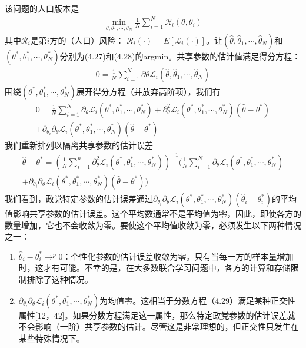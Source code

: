 该问题的人口版本是
\begin{align}
	\min_{\theta, \theta_{1}, \cdots, \theta_{N}} \frac{1}{N} \sum_{i=1}^{N} \mathcal{R}_{i}(\theta, \theta_{i}) \label{eq:4-28}
\end{align}
其中$\mathcal{R}_{i}$是第$i$方的（人口）风险： $\mathcal{R}_{i}(\cdot) = E[\mathcal{L}_{i}(\cdot)]$。让$(\hat{\theta}, \hat{\theta}_{1}, \cdots, \hat{\theta}_{N})$和$(\theta^{*}, \theta_{1}^{*}, \cdots, \theta_{N}^{*})$分别为(4.27)和(4.28)的argmin。共享参数的估计值满足得分方程：
\begin{align}
	0 = \frac{1}{N} \sum_{i=1}^{N} \partial{\theta} \mathcal{L}_{i}(\hat{\theta}, \hat{\theta}_{1}, \cdots, \hat{\theta}_{N})
\end{align}
围绕$(\theta^{*}, \theta_{1}^{*}, \cdots, \theta_{N}^{*})$展开得分方程（并放弃高阶项），我们有
\begin{align*}
	0 = \frac{1}{N} \sum_{i=1}^{N} \partial_{\theta} \mathcal{L}_{i}(\theta^{*}, \theta_{1}^{*}, \cdots, \theta_{N}^{*}) + \partial_{\theta}^{2} \mathcal{L}_{i}(\theta^{*}, \theta_{1}^{*}, \cdots, \theta_{N}^{*})(\hat{\theta} - \theta^{*}) \\
	+ \partial_{\theta_{i}}\partial_{\theta} \mathcal{L}_{i} (\theta^{*}, \theta_{1}^{*}, \cdots, \theta_{N}^{*})(\hat{\theta} - \theta^{*})
\end{align*}
我们重新排列以隔离共享参数的估计误差
\begin{align*}
	\hat{\theta} - \theta^{*} = (\frac{1}{N} \sum_{i=1}^{n} \partial_{\theta}^{2} \mathcal{L}_{i}(\theta^{*}, \theta_{1}^{*}, \cdots, \theta_{N}^{*}))^{-1} (\frac{1}{N} \sum_{i=1}^{N} \partial_{\theta} \mathcal{L}_{i}(\theta^{*}, \theta_{1}^{*}, \cdots, \theta_{N}^{*}) \\
	+ \partial_{\theta_{i}}\partial_{\theta} \mathcal{L}_{i} (\theta^{*}, \theta_{1}^{*}, \cdots, \theta_{N}^{*})(\hat{\theta} - \theta^{*}))
\end{align*}
我们看到，政党特定参数的估计误差通过$\partial_{\theta_{i}}\partial_{\theta} \mathcal{L}_{i}(\theta^{*}, \theta_{1}^{*}, \cdots, \theta_{N}^{*})(\hat{\theta}_{i} - \theta_{i}^{*})$的平均值影响共享参数的估计误差。这个平均数通常不是平均值为零，因此，即使各方的数量增加，它也不会收敛为零。要使这个平均值收敛为零，必须发生以下两种情况之一：
\begin{enumerate}
	\item $\hat{\theta}_{i} - \theta_{i}^{*} \rightarrow^{p} 0$：个性化参数的估计误差收敛为零。只有当每一方的样本量增加时，这才有可能。不幸的是，在大多数联合学习问题中，各方的计算和存储限制排除了这种情况。
	\item $\partial_{\theta_{i}}\partial_{\theta} \mathcal{L}_{i}(\theta^{*}, \theta_{1}^{*}, \cdots, \theta_{N}^{*})$为均值零。这相当于分数方程（4.29）满足某种正交性属性[12，42]。如果分数方程满足这一属性，那么特定政党参数的估计误差就不会影响（一阶）共享参数的估计。尽管这是非常理想的，但正交性只发生在某些特殊情况下。
\end{enumerate}

